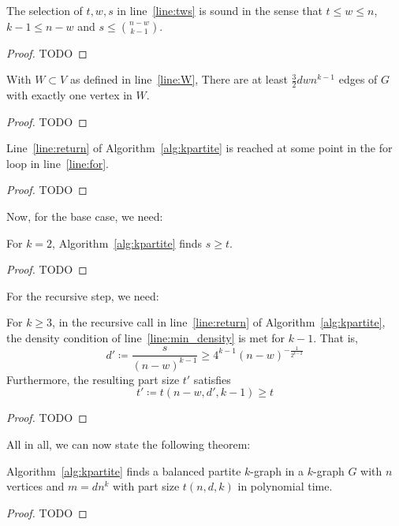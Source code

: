 \begin{lemma}
    The selection of $t, w, s$ in line~\ref{line:tws} is sound in the sense that
    $t  \leq w \leq n$, $k - 1 \leq n - w$ and $s \leq \binom{n - w}{k - 1}$.
    \begin{proof}
        TODO %
    \end{proof}
\end{lemma}

\begin{lemma}
    With $W  \subset V$ as defined in line~\ref{line:W},
    There are at least $\frac{3}{2}dwn^{k-1}$ edges of $G$ with exactly one vertex in $W$.
    \begin{proof}
        TODO %
    \end{proof}
\end{lemma}

\begin{lemma}
    Line~\ref{line:return} of Algorithm~\ref{alg:kpartite} is reached at some point in the for
    loop in line~\ref{line:for}.
    \begin{proof}
        TODO %
    \end{proof}
\end{lemma}

Now, for the base case, we need:

\begin{lemma}
    For $k=2$, Algorithm~\ref{alg:kpartite} finds $s \geq t$.
    \begin{proof}
        TODO %
    \end{proof}
\end{lemma}

For the recursive step, we need:

\begin{lemma}
    For $k \geq 3$, in the recursive call in line~\ref{line:return} of Algorithm~\ref{alg:kpartite},
    the density condition of line~\ref{line:min_density} is met for $k-1$.
    That is,
    \[
        d' \coloneqq \frac{s}{(n-w)^{k-1}} \geq 4^{k-1} (n-w)^{-\frac{1}{2^{k-2}}}
    \]
    Furthermore,
    the resulting part size $t'$ satisfies
    \[
        t' \coloneqq t(n - w, d', k - 1) \geq t
    \]
    \begin{proof}
        TODO %
    \end{proof}

\end{lemma}

All in all, we can now state the following theorem:

\begin{theorem}
    Algorithm~\ref{alg:kpartite} finds a balanced partite $k$-graph in a $k$-graph $G$ with
    $n$ vertices and $m = d n^k$ with part size $t(n, d, k)$ in polynomial time.
    \begin{proof}
        TODO %
    \end{proof}
\end{theorem}





